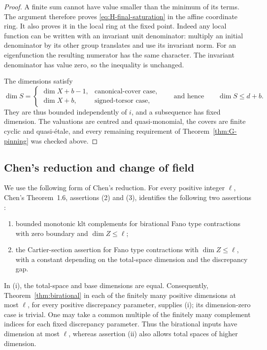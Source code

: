 \begin{proof}
A finite sum cannot have value smaller than the minimum of its terms.
The argument therefore proves \eqref{eq:H-final-saturation} in the
affine coordinate ring.  It also proves it in the local ring at the
fixed point.  Indeed any local function can be written with an invariant
unit denominator: multiply an initial denominator by its other group
translates and use its invariant norm.  For an eigenfunction the resulting
numerator has the same character.  The invariant denominator has value
zero, so the inequality is unchanged.

The dimensions satisfy
\[
 \dim S=
 \begin{cases}
 \dim X+b-1,&\text{canonical-cover case},\\
 \dim X+b,&\text{signed-torsor case},
 \end{cases}
 \qquad\text{and hence}\qquad \dim S\le d+b.
\]
They are thus bounded independently of $i$, and a subsequence has fixed
dimension.  The valuations are centred and quasi-monomial, the covers
are finite cyclic and quasi-\'{e}tale, and every remaining requirement
of Theorem~\ref{thm:G-pinning} was checked above.
\end{proof}

\subsection{Chen's reduction and change of field}

We use the following form of Chen's reduction.
For every positive integer $\ell$, Chen's Theorem~1.6, assertions (2) and (3),
identifies the following two assertions \cite{Chen2025}:
\begin{enumerate}[label=(\roman*)]
\item bounded monotonic klt complements for birational Fano type
contractions with zero boundary and $\dim Z\le\ell$;
\item the Cartier-section assertion for Fano type contractions with
$\dim Z\le\ell$, with a constant depending on the total-space dimension
and the discrepancy gap.
\end{enumerate}
In (i), the total-space and base dimensions are equal.  Consequently,
Theorem~\ref{thm:birational} in each of the finitely many positive
dimensions at most $\ell$, for every positive discrepancy parameter,
supplies (i); its dimension-zero case is
trivial.  One may take a common multiple of the finitely many complement
indices for each fixed discrepancy parameter.  Thus the birational
inputs have dimension at most $\ell$, whereas assertion (ii) also allows
total spaces of higher dimension.

